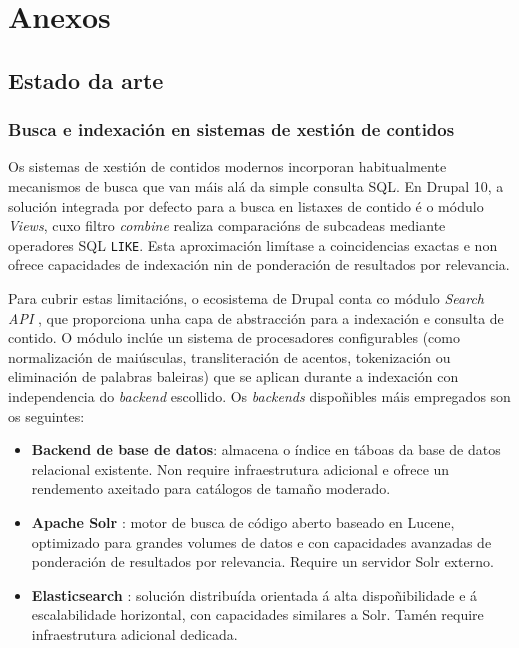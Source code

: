 \documentclass[%
    a4paper,               %
    twoside,               %
    10pt,                  %
]{article}                 %
\begin{document}
\section{Anexos}
\renewcommand{\thesubsection}{\Alph{subsection}}
\renewcommand{\thesubsubsection}{\thesubsection.\arabic{subsubsection}}

\subsection{Estado da arte}

\subsubsection{Busca e indexación en sistemas de xestión de contidos}
\label{anx:search_api}

Os sistemas de xestión de contidos modernos incorporan habitualmente mecanismos de busca que van máis alá da simple consulta SQL. En Drupal 10, a solución integrada por defecto para a busca en listaxes de contido é o módulo \textit{Views}, cuxo filtro \textit{combine} realiza comparacións de subcadeas mediante operadores SQL \texttt{LIKE}. Esta aproximación limítase a coincidencias exactas e non ofrece capacidades de indexación nin de ponderación de resultados por relevancia.

Para cubrir estas limitacións, o ecosistema de Drupal conta co módulo \textit{Search API} \cite{search_api}, que proporciona unha capa de abstracción para a indexación e consulta de contido. O módulo inclúe un sistema de procesadores configurables (como normalización de maiúsculas, transliteración de acentos, tokenización ou eliminación de palabras baleiras) que se aplican durante a indexación con independencia do \textit{backend} escollido. Os \textit{backends} dispoñibles máis empregados son os seguintes:

\begin{itemize}
    \item \textbf{Backend de base de datos}: almacena o índice en táboas da base de datos relacional existente. Non require infraestrutura adicional e ofrece un rendemento axeitado para catálogos de tamaño moderado.

    \item \textbf{Apache Solr} \cite{solr}: motor de busca de código aberto baseado en Lucene, optimizado para grandes volumes de datos e con capacidades avanzadas de ponderación de resultados por relevancia. Require un servidor Solr externo.

    \item \textbf{Elasticsearch} \cite{elasticsearch}: solución distribuída orientada á alta dispoñibilidade e á escalabilidade horizontal, con capacidades similares a Solr. Tamén require infraestrutura adicional dedicada.
\end{itemize}
\end{document}

